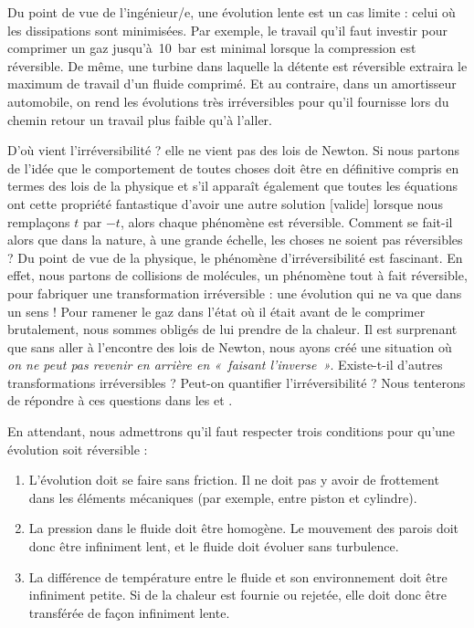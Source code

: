 		Du point de vue de l’ingénieur/e, une évolution lente est un cas limite : celui où les dissipations sont minimisées. Par exemple, le travail qu’il faut investir pour comprimer un gaz jusqu’à~\SI{10}{\bar} est minimal lorsque la compression est réversible. De même, une turbine dans laquelle la détente est réversible extraira le maximum de travail d’un fluide comprimé. Et au contraire, dans un amortisseur automobile, on rend les évolutions très irréversibles pour qu’il fournisse lors du chemin retour un travail plus faible qu’à l’aller.
		
		D’où vient l’irréversibilité ? elle ne vient pas des lois de Newton. Si nous partons de l’idée que le comportement de toutes choses doit être en définitive compris en termes des lois de la physique et s’il apparaît également que toutes les équations ont cette propriété fantastique d’avoir une autre solution [valide] lorsque nous remplaçons $t$ par $-t$, alors chaque phénomène est réversible. Comment se fait-il alors que dans la nature, à une grande échelle, les choses ne soient pas réversibles ?
		Du point de vue de la physique, le phénomène d’irréversibilité est fascinant. En effet, nous partons de collisions de molécules, un phénomène tout à fait réversible, pour fabriquer une transformation irréversible : une évolution qui ne va que dans un sens ! Pour ramener le gaz dans l’état où il était avant de le comprimer brutalement, nous sommes obligés de lui prendre de la chaleur. Il est surprenant que sans aller à l’encontre des lois de Newton, nous ayons créé une situation où \emph{on ne peut pas revenir en arrière en «~faisant l’inverse~»}. Existe-t-il d’autres transformations irréversibles ? Peut-on quantifier l’irréversibilité ? Nous tenterons de répondre à ces questions dans les \courssept et \courshuit.

		En attendant, nous admettrons qu’il faut respecter trois conditions pour qu’une évolution soit réversible :

		\begin{enumerate}
			\item L’évolution doit se faire sans friction. Il ne doit pas y avoir de frottement dans les éléments mécaniques (par exemple, entre piston et cylindre).
			\item La pression dans le fluide doit être homogène. Le mouvement des parois doit donc être infiniment lent, et le fluide doit évoluer sans turbulence.
			\item La différence de température entre le fluide et son environnement doit être infiniment petite. Si de la chaleur est fournie ou rejetée, elle doit donc être transférée de façon infiniment lente.
		\end{enumerate}

